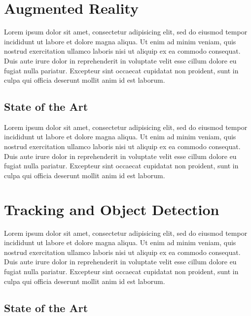 

\section{Augmented Reality} %
\label{sec:basic_concepts:augmented_reality}

Lorem ipsum dolor sit amet, consectetur adipisicing elit, sed do eiusmod
tempor incididunt ut labore et dolore magna aliqua. Ut enim ad minim veniam,
quis nostrud exercitation ullamco laboris nisi ut aliquip ex ea commodo
consequat. Duis aute irure dolor in reprehenderit in voluptate velit esse
cillum dolore eu fugiat nulla pariatur. Excepteur sint occaecat cupidatat non
proident, sunt in culpa qui officia deserunt mollit anim id est laborum.

\subsection{State of the Art} %
\label{sub:basic_concepts:augmented_reality:state_of_the_art}

Lorem ipsum dolor sit amet, consectetur adipisicing elit, sed do eiusmod
tempor incididunt ut labore et dolore magna aliqua. Ut enim ad minim veniam,
quis nostrud exercitation ullamco laboris nisi ut aliquip ex ea commodo
consequat. Duis aute irure dolor in reprehenderit in voluptate velit esse
cillum dolore eu fugiat nulla pariatur. Excepteur sint occaecat cupidatat non
proident, sunt in culpa qui officia deserunt mollit anim id est laborum.



\section{Tracking and Object Detection} %
\label{sec:basic_concepts:tracking}

Lorem ipsum dolor sit amet, consectetur adipisicing elit, sed do eiusmod
tempor incididunt ut labore et dolore magna aliqua. Ut enim ad minim veniam,
quis nostrud exercitation ullamco laboris nisi ut aliquip ex ea commodo
consequat. Duis aute irure dolor in reprehenderit in voluptate velit esse
cillum dolore eu fugiat nulla pariatur. Excepteur sint occaecat cupidatat non
proident, sunt in culpa qui officia deserunt mollit anim id est laborum.

\subsection{State of the Art} %
\label{sub:basic_concepts:tracking:state_of_the_art}



